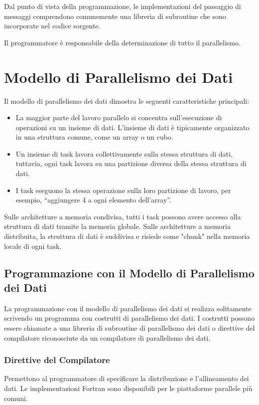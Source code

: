 Dal punto di vista della programmazione, le implementazioni
del passaggio di messaggi comprendono comunemente una
libreria di subroutine che sono incorporate nel codice
sorgente.

Il programmatore è responsabile della determinazione di
tutto il parallelismo.
\section{Modello di Parallelismo dei Dati}
Il modello di parallelismo dei dati dimostra le seguenti
caratteristiche principali:

\begin{itemize}
    \item La maggior parte del lavoro parallelo si
    concentra sull'esecuzione di operazioni su un
    insieme di dati. L'insieme di dati è tipicamente
    organizzato in una struttura comune, come un array
    o un cubo.
    \item Un insieme di task lavora collettivamente sulla
    stessa struttura di dati, tuttavia, ogni task lavora
    su una partizione diversa della stessa struttura di
    dati.
    \item I task eseguono la stessa operazione sulla loro
    partizione di lavoro, per esempio, ``aggiungere 4 a
    ogni elemento dell'array''.
\end{itemize}

Sulle architetture a memoria condivisa, tutti i task
possono avere accesso alla struttura di dati tramite
la memoria globale. Sulle architetture a memoria
distribuita, la struttura di dati è suddivisa e risiede
come "chunk" nella memoria locale di ogni task.

\subsection{Programmazione con il Modello di Parallelismo
dei Dati}
La programmazione con il modello di parallelismo dei dati
si realizza solitamente scrivendo un programma con
costrutti di parallelismo dei dati. I costrutti possono
essere chiamate a una libreria di subroutine di
parallelismo dei dati o direttive del compilatore
riconosciute da un compilatore di parallelismo dei dati.

\subsubsection{Direttive del Compilatore}
Permettono al programmatore di specificare la
distribuzione e l'allineamento dei dati. Le
implementazioni Fortran sono disponibili per le
piattaforme parallele più comuni.

